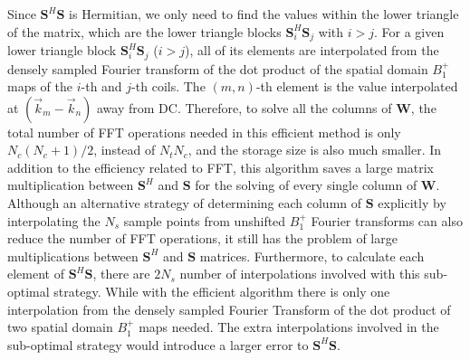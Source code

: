 Since $\mathbf{S}^{H}\mathbf{S}$ is Hermitian, we only need to find the values within the lower triangle of the matrix, which are the lower triangle blocks $\mathbf{S}_i^{H}\mathbf{S}_j$ with $i>j$. For a given lower triangle block $\mathbf{S}_i^{H}\mathbf{S}_j$  ($i>j$), all of its elements are interpolated from the densely sampled Fourier transform of the dot product of the spatial domain $B_1^+$ maps of the $i$-th and $j$-th coils. The $(m,n)$-th element is the value interpolated at $(\vec{k}_m-\vec{k}_n)$ away from DC. Therefore, to solve all the columns of $\mathbf{W}$, the total number of FFT operations needed in this efficient method is only $N_c(N_c+1)/2$, instead of ${N_t}{N_c}$, and the storage size is also much smaller. In addition to the efficiency related to FFT, this algorithm saves a large matrix multiplication between $\mathbf{S}^{H}$ and $\mathbf{S}$ for the solving of every single column of $\mathbf{W}$. 
Although an alternative strategy of determining each column of $\mathbf{S}$ explicitly by interpolating the $N_s$ sample points from unshifted $B_1^+$ Fourier transforms can also reduce the number of FFT operations, it still has the problem of large multiplications between $\mathbf{S}^{H}$ and $\mathbf{S}$ matrices. Furthermore, to calculate each element of $\mathbf{S}^{H}\mathbf{S}$, there are $2N_s$ number of interpolations involved with this sub-optimal strategy. While with the efficient algorithm there is only one interpolation from the densely sampled Fourier Transform of the dot product of two spatial domain $B_1^+$ maps needed. The extra interpolations involved in the sub-optimal strategy would introduce a larger error to $\mathbf{S}^{H}\mathbf{S}$.  

